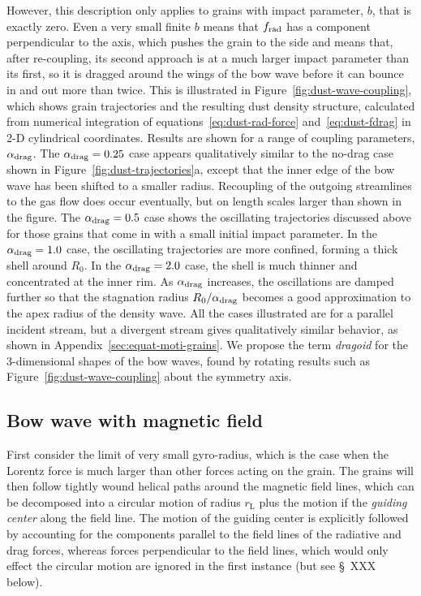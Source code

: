 However, this description only applies to grains with impact
parameter, \(b\), that is exactly zero.  Even a very small finite
\(b\) means that \(f_{\text{rad}}\) has a component perpendicular to the axis,
which pushes the grain to the side and means that, after re-coupling,
its second approach is at a much larger impact parameter than its
first, so it is dragged around the wings of the bow wave before it can
bounce in and out more than twice.  This is illustrated in
Figure~\ref{fig:dust-wave-coupling}, which shows grain trajectories
and the resulting dust density structure, calculated from numerical
integration of equations~\eqref{eq:dust-rad-force}
and~\eqref{eq:dust-fdrag} in 2-D cylindrical coordinates.  Results are
shown for a range of coupling parameters, \(\alpha_{\text{drag}}\).  The
\(\alpha_{\text{drag}} = 0.25\) case appears qualitatively similar to the no-drag
case shown in Figure~\ref{fig:dust-trajectories}a, except that the
inner edge of the bow wave has been shifted to a smaller radius.
Recoupling of the outgoing streamlines to the gas flow does occur
eventually, but on length scales larger than shown in the figure. The
\(\alpha_{\text{drag}} = 0.5\) case shows the oscillating trajectories discussed
above for those grains that come in with a small initial impact
parameter.  In the \(\alpha_{\text{drag}} = 1.0\) case, the oscillating trajectories
are more confined, forming a thick shell around \(R_0\).  In the
\(\alpha_{\text{drag}} = 2.0\) case, the shell is much thinner and concentrated at
the inner rim.  As \(\alpha_{\text{drag}}\) increases, the oscillations are damped
further so that the stagnation radius \(R_0 / \alpha_{\text{drag}}\) becomes a good
approximation to the apex radius of the density wave.  All the cases
illustrated are for a parallel incident stream, but a divergent stream
gives qualitatively similar behavior, as shown in
Appendix~\ref{sec:equat-moti-grains}.  We propose the term
\textit{dragoid} for the 3-dimensional shapes of the bow waves, found
by rotating results such as Figure~\ref{fig:dust-wave-coupling} about
the symmetry axis.


\subsection{Bow wave with magnetic field}
\label{sec:bow-wave-with}

\newcommand\Larmor{\ensuremath{_{\text{L}}}}

First consider the limit of very small gyro-radius, which is the case
when the Lorentz force is much larger than other forces acting on the
grain. The grains will then follow tightly wound helical paths around
the magnetic field lines, which can be decomposed into a circular
motion of radius \(r\Larmor\) plus the motion if the \textit{guiding
  center} along the field line.  The motion of the guiding center is
explicitly followed by accounting for the components parallel to the
field lines of the radiative and drag forces, whereas forces
perpendicular to the field lines, which would only effect the circular
motion are ignored in the first instance (but see \S~XXX below).

